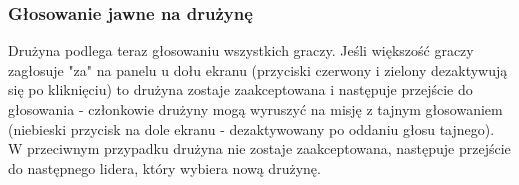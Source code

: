 \documentclass[12pt]{article}
\begin{document}
\subsubsection{Głosowanie jawne na drużynę}
Drużyna podlega teraz głosowaniu wszystkich graczy. Jeśli większość graczy zagłosuje "za" na panelu u dołu ekranu (przyciski czerwony i zielony dezaktywują się po kliknięciu) to drużyna zostaje zaakceptowana i następuje przejście do głosowania - członkowie drużyny mogą wyruszyć na misję z tajnym głosowaniem (niebieski przycisk na dole ekranu - dezaktywowany po oddaniu głosu tajnego).
W przeciwnym przypadku drużyna nie zostaje zaakceptowana, następuje przejście do następnego lidera, który wybiera nową drużynę.
\begin{figure}[!htb]
    \centering
    \centering
\end{figure}


\newpage
\end{document}
